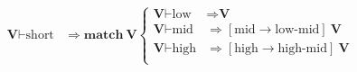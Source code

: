 \documentclass{report}[12pt]
\begin{document}
\begin{tcolorbox}
\begin{align*}
    \textbf{V} \vdash \text{short} & \Rightarrow 
    \textbf{match}\ \textbf{V} \begin{cases}
                                \textbf{V} \vdash \text{low} & \Rightarrow \textbf{V} \\
                                \textbf{V} \vdash \text{mid} & \Rightarrow [\text{mid} \rightarrow \text{low-mid}]\ \textbf{V} \\
                                \textbf{V} \vdash \text{high} & \Rightarrow [\text{high} \rightarrow \text{high-mid}]\ \textbf{V} \\
                              \end{cases} \\
  \end{align*}
\end{tcolorbox}
\end{document}
